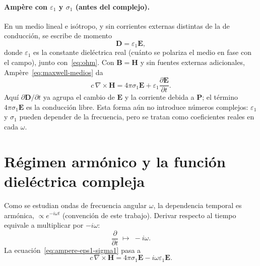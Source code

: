 \paragraph{Amp\`ere con $\varepsilon_1$ y $\sigma_1$ (antes del complejo).}
En un medio lineal e is\'otropo, y sin corrientes externas distintas de la de conducci\'on, se escribe de momento
\begin{equation}
\label{eq:D-eps1}
\mathbf{D}=\varepsilon_1\mathbf{E},
\end{equation}
donde $\varepsilon_1$ es la constante diel\'ectrica real (cu\'anto se polariza el medio en fase con el campo),
junto con~\eqref{eq:ohm}.
Con $\mathbf{B}=\mathbf{H}$ y sin fuentes externas adicionales, Amp\`ere~\eqref{eq:maxwell-medios} da
\begin{equation}
\label{eq:ampere-eps1-sigma1}
c\,\nabla\times\mathbf{H}
=4\pi\sigma_1\mathbf{E}+\varepsilon_1\frac{\partial\mathbf{E}}{\partial t}.
\end{equation}
Aqu\'i $\partial\mathbf{D}/\partial t$ ya agrupa el cambio de $\mathbf{E}$ y la corriente debida a $\mathbf{P}$;
el t\'ermino $4\pi\sigma_1\mathbf{E}$ es la conducci\'on libre.
Esta forma a\'un no introduce n\'umeros complejos: $\varepsilon_1$ y $\sigma_1$ pueden depender de la frecuencia, pero se tratan como coeficientes reales en cada $\omega$.

\section{R\'egimen arm\'onico y la funci\'on diel\'ectrica compleja}

Como se estudian ondas de frecuencia angular $\omega$, la dependencia temporal es arm\'onica,
$\propto e^{-i\omega t}$ (convenci\'on de este trabajo).
Derivar respecto al tiempo equivale a multiplicar por $-i\omega$:
\begin{equation}
\frac{\partial}{\partial t}\;\longmapsto\; -i\omega.
\end{equation}
La ecuaci\'on~\eqref{eq:ampere-eps1-sigma1} pasa a
\begin{equation}
\label{eq:ampere-armonico}
c\,\nabla\times\mathbf{H}
=4\pi\sigma_1\mathbf{E}-i\omega\varepsilon_1\mathbf{E}.
\end{equation}

